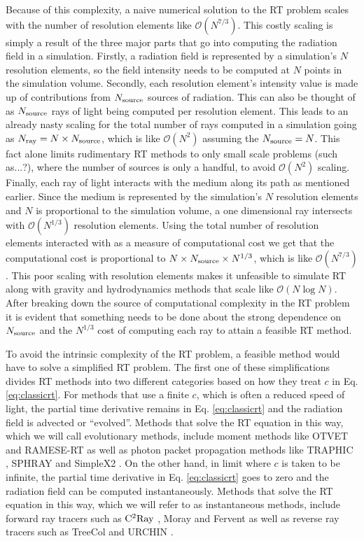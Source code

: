 \documentclass[fleq,usenatbib]{mnras}
\newcommand{\bigO}[1]{\mathcal{O}\left(#1\right)}
\newcommand{\NS}{N_{\rm source}}
\newcommand{\NR}{N_{\rm ray}}
\begin{document}
Because of this complexity, a naive numerical solution to the RT problem 
scales with the number of resolution elements like $\bigO{N^{7/3}}$. This 
costly scaling is simply a result of the three major parts that go into 
computing the radiation field in a simulation. Firstly, a radiation field is 
represented by a simulation's $N$ resolution elements, so the field intensity 
needs to be computed at $N$ points in the simulation volume. Secondly, each 
resolution element's intensity value is made up of contributions from $\NS$ 
sources of radiation. This can also be thought of as $\NS$ rays of light being 
computed per resolution element. This leads to an already nasty scaling for 
the total number of rays computed in a simulation going as $\NR = N 
\times \NS$, which is like $\bigO{N^2}$ assuming the $\NS = N$. This fact 
alone limits rudimentary RT methods to only small scale problems 
(such as...?), where the number of sources is only a handful, to avoid 
$\bigO{N^2}$ scaling. Finally, each ray of light interacts with the medium 
along its path as mentioned earlier. Since the medium is represented by the 
simulation's $N$ resolution elements and $N$ is proportional to the simulation 
volume, a one dimensional ray intersects with $\bigO{N^{1/3}}$ resolution 
elements. Using the total number of resolution elements interacted with as a 
measure of computational cost we get that the computational cost is 
proportional to $N \times \NS \times N^{1/3}$, which is like $\bigO{N^{7/3}}$. 
This poor scaling with resolution elements makes it unfeasible to simulate RT 
along with gravity and hydrodynamics methods that scale like $\bigO{N\log N}$. 
After breaking down the source of computational complexity in the RT problem 
it is evident that something needs to be done about the strong dependence on 
$\NS$ and the $N^{1/3}$ cost of computing each ray to attain a feasible RT 
method.

To avoid the intrinsic complexity of the RT problem, a feasible method would 
have to solve a simplified RT problem. The first one of these simplifications 
divides RT methods into two different categories based on how they treat $c$ 
in Eq. \ref{eq:classicrt}. For methods that use a finite $c$, which is 
often a reduced speed of light, the partial time derivative remains in 
Eq. \ref{eq:classicrt} and the radiation field is advected or 
``evolved''. Methods that solve the RT equation in this way, which we will 
call evolutionary methods, include moment methods like OTVET 
\citep{gnedinAbel01} and  RAMESE-RT \citep{rosdahlTeyssier15} as well as 
photon packet propagation methods like TRAPHIC \citep{pawlikSchaye08}, SPHRAY 
\citep{altayEt08} and SimpleX2 \citep{paardekooperEt10}. On the other hand, in 
limit where $c$ is taken to be infinite, the partial time derivative in 
Eq. \ref{eq:classicrt} goes to zero and the radiation field can be 
computed instantaneously. Methods that solve the RT equation in this way, 
which we will refer to as instantaneous methods, include forward ray tracers 
such as $\rm C^2Ray$ \citep{mellemaEt06a}, Moray \citep{wiseAbel11} and 
Fervent \citep{baczynskiEt15} as well as reverse ray tracers such as TreeCol 
\citep{clarkEt12} and URCHIN \citep{altayTheuns13}. 
\end{document}
